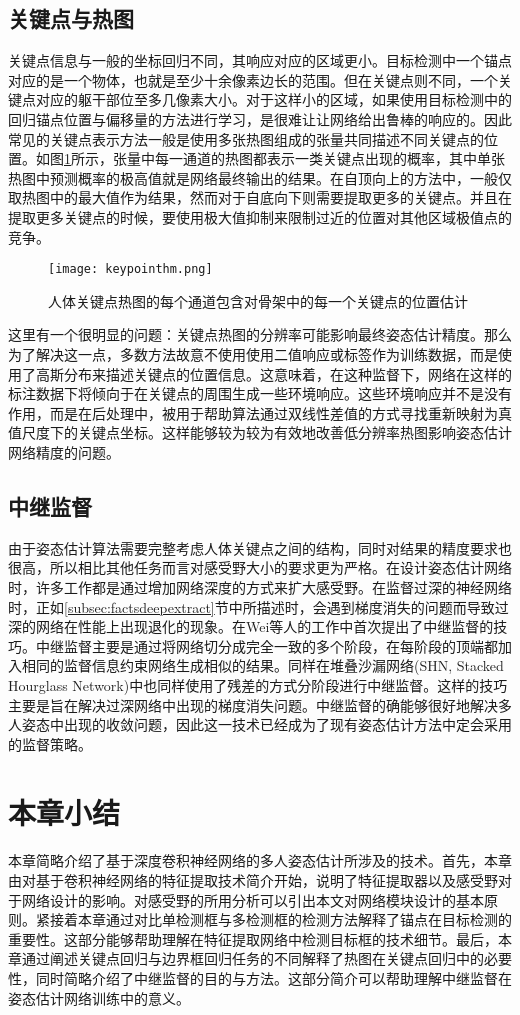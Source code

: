 \subsection{关键点与热图}
\label{subsec:factsheatmaps}
关键点信息与一般的坐标回归不同，其响应对应的区域更小。目标检测中一个锚点对应的是一个物体，也就是至少十余像素边长的范围。但在关键点则不同，一个关键点对应的躯干部位至多几像素大小。对于这样小的区域，如果使用目标检测中的回归锚点位置与偏移量的方法进行学习，是很难让让网络给出鲁棒的响应的。因此常见的关键点表示方法一般是使用多张热图组成的张量共同描述不同关键点的位置。如图\ref{fig:keypointhm}所示，张量中每一通道的热图都表示一类关键点出现的概率，其中单张热图中预测概率的极高值就是网络最终输出的结果。在自顶向上的方法中，一般仅取热图中的最大值作为结果，然而对于自底向下则需要提取更多的关键点。并且在提取更多关键点的时候，要使用极大值抑制来限制过近的位置对其他区域极值点的竞争。

\begin{figure}[h]	
	\centering
	\texttt{[image: keypointhm.png]}
	\caption{人体关键点热图的每个通道包含对骨架中的每一个关键点的位置估计\cite{newell2016stacked}}
	\label{fig:keypointhm}
\end{figure}

这里有一个很明显的问题：关键点热图的分辨率可能影响最终姿态估计精度。那么为了解决这一点，多数方法故意不使用使用二值响应或标签作为训练数据，而是使用了高斯分布来描述关键点的位置信息。这意味着，在这种监督下，网络在这样的标注数据下将倾向于在关键点的周围生成一些环境响应。这些环境响应并不是没有作用，而是在后处理中，被用于帮助算法通过双线性差值的方式寻找重新映射为真值尺度下的关键点坐标。这样能够较为较为有效地改善低分辨率热图影响姿态估计网络精度的问题。

\subsection{中继监督}
\label{subsec:factsintersupervision}
由于姿态估计算法需要完整考虑人体关键点之间的结构，同时对结果的精度要求也很高，所以相比其他任务而言对感受野大小的要求更为严格。在设计姿态估计网络时，许多工作都是通过增加网络深度的方式来扩大感受野。在监督过深的神经网络时，正如\ref{subsec:factsdeepextract}节中所描述时，会遇到梯度消失的问题而导致过深的网络在性能上出现退化的现象。在Wei等人的工作中\cite{wei2016convolutional}首次提出了中继监督的技巧。中继监督主要是通过将网络切分成完全一致的多个阶段，在每阶段的顶端都加入相同的监督信息约束网络生成相似的结果。同样在堆叠沙漏网络(SHN, Stacked Hourglass Network)\cite{newell2016stacked}中也同样使用了残差的方式分阶段进行中继监督。这样的技巧主要是旨在解决过深网络中出现的梯度消失问题。中继监督的确能够很好地解决多人姿态中出现的收敛问题，因此这一技术已经成为了现有姿态估计方法中定会采用的监督策略。

\section{本章小结}
本章简略介绍了基于深度卷积神经网络的多人姿态估计所涉及的技术。首先，本章由对基于卷积神经网络的特征提取技术简介开始，说明了特征提取器以及感受野对于网络设计的影响。对感受野的所用分析可以引出本文对网络模块设计的基本原则。紧接着本章通过对比单检测框与多检测框的检测方法解释了锚点在目标检测的重要性。这部分能够帮助理解在特征提取网络中检测目标框的技术细节。最后，本章通过阐述关键点回归与边界框回归任务的不同解释了热图在关键点回归中的必要性，同时简略介绍了中继监督的目的与方法。这部分简介可以帮助理解中继监督在姿态估计网络训练中的意义。
